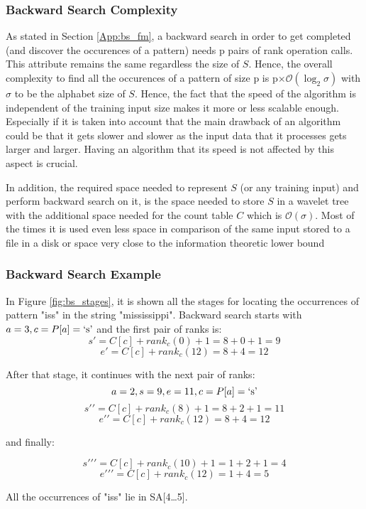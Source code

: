 \subsubsection{Backward Search Complexity}
As stated in Section \ref{App:bs_fm}, a backward search in order to get completed (and discover the occurences of a pattern) needs p pairs of rank operation calls. This attribute remains the same regardless the size of $S$. Hence, the overall complexity to find all the occurences of a pattern of size p is p\(\times\mathcal{O}(\log_2\sigma)\) with $\sigma$ to be the alphabet size of $S$. Hence, the fact that the speed of the algorithm is independent of the training input size makes it more or less scalable enough. Especially if it is taken into account that the main drawback of an algorithm could be that it gets slower and slower as the input data that it processes gets larger and larger. Having an algorithm that its speed is not affected by this aspect is crucial.
\par In addition, the required space needed to represent $S$ (or any training input) and perform backward search on it, is the space needed to store $S$ in a wavelet tree with the additional space needed for the count table $C$ which is \(\mathcal{O}(\sigma)\). Most of the times it is used even less space in comparison of the same input stored to a file in a disk or space very close to the information theoretic lower bound  \cite{ktistakis}

\subsubsection{Backward Search Example}{\label{bs-ex}}
In Figure \ref{fig:bs_stages}, it is shown all the stages for locating the occurrences of pattern "iss" in the string "mississippi". Backward search starts with \(a=3, c=P[a]=\text{\lq{s}\rq}\) and the first pair of ranks is:
\[s\prime = C[c] + rank_c(0) + 1 = 8+0+1=9\]
\[e\prime = C[c] + rank_c(12) = 8+4=12\]

After that stage, it continues with the next pair of ranks:
\[a=2,s=9, e=11, c=P[a]=\text{\lq{s}\rq}\]
\[s\prime\prime = C[c] + rank_c(8) + 1 = 8+2+1=11\]
\[e\prime\prime = C[c] + rank_c(12)= 8+4=12\]

and finally:

\[s\prime\prime\prime = C[c] + rank_c(10) + 1 = 1+2+1=4\]
\[e\prime\prime\prime = C[c] + rank_c(12)= 1+4=5\]

All the occurrences of "iss" lie in SA[4\ldots 5].


